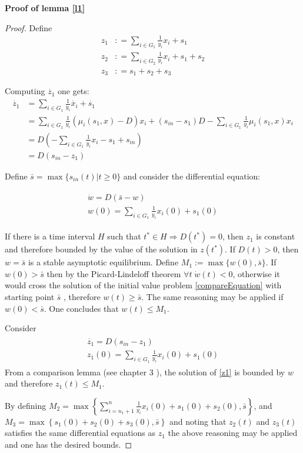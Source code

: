 \documentclass[3p,times]{elsarticle}
\begin{document}
\textbf{Proof of lemma \ref{l1}}
\begin{proof}
	Define 
	\begin{align}
	z_1 &: = \sum \limits_{i \in G_1} \frac{1}{y_i}x_i + s_1  \\
	z_2 &: = \sum \limits_{i \in G_2} \frac{1}{y_i}x_i + s_1 + s_2 \\
	z_3 &: = s_1 + s_2 + s_3
	\end{align} 
	
	Computing $\dot{z_{1}}$ one gets:
	\begin{align*}
	\dot{z_{1}} &=\sum \limits_{i \in G_1} \frac{1}{y_i}\dot{x_i} + \dot{s_1} \\
	& = \sum \limits_{i \in G_1} \frac{1}{y_i}\left(\mu_i(s_1,x) -D \right)x_i + (s_{in}-s_1)D-\sum\limits_{i \in G_1}\frac{1}{y_i}\mu_i(s_1,x) x_i   \\
	&= 	D\left(-\sum \limits_{i \in G_1} \frac{1}{y_i}x_i - s_1 + s_{in}\right)  \\
	& = D(s_{in} - z_1)
	\end{align*}
	
	Define $\bar{s} =\max\{s_{in}(t) | t\geq 0\}$ and consider the differential equation:
	
	\begin{align}
	\label{compareEquation}
	\begin{array}{l}
	\dot{w} = D(\bar{s} - w) \\
	w(0) = \sum \limits_{i \in G_1} \frac{1}{y_i}x_i(0) + s_1(0)
	\end{array}
	\end{align}
	
	If there is a time interval $H$ such that $t^*\in H  \Rightarrow D(t^*) = 0$, then $z_1$ is constant and therefore bounded by  the value of the solution in $z(t^*)$. 
	If $D(t) > 0$, then $w = \bar{s}$ is a stable asymptotic equilibrium. Define $M_1 :=  \max\{w(0),\bar{s}\}$. If $ w(0) > \bar{s}$ then by the Picard-Lindeloff theorem $ \forall t \; \dot{w}(t) < 0 $, otherwise it would cross the solution of the initial value problem \eqref{compareEquation} with starting point $\bar{s}$ , therefore $w(t) \geq \bar{s}$. The same reasoning may be applied if $ w(0) < \bar{s}$. One concludes that $ w(t) \leq M_1 $. 
	
	Consider  
	\begin{align}
	\label{z1} \begin{array}{l}
	\dot{z_1} =  D(s_{in} - z_1)\\
	z_1(0) = \sum \limits_{i \in G_1} \frac{1}{y_i}x_i(0) + s_1(0)
	\end{array} 
	\end{align}
	From a comparison lemma (see chapter 3 \cite{Khalil1996}), the solution of \eqref{z1} is bounded by $w$ and therefore $z_1(t) \leq M_1$.
	
	By defining $M_2 = \max\left \{ \displaystyle \sum \limits_{i=n_1 +1 }^{n} \frac{1}{y_i}x_i(0) + s_1(0) +s_2(0), \bar{s} \right\}$, and $M_3 =\max\left \{ s_1(0) +s_2(0) + s_3(0), \bar{s} \right\} $ and noting that $z_2(t)$ and $z_3(t)$ satisfies the same differential equations as $z_1$ the above reasoning may be applied and one has the desired bounds.
\end{proof}
\end{document}
